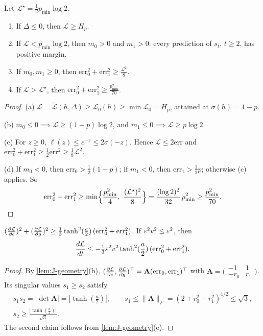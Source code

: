 \begin{lemma}
\label{lem:J-levels}
Let $\mathcal L^\star=\frac{1}{2}p_{\min}\log2$.
\begin{enumerate}[label=(\alph*),leftmargin=*,itemsep=2pt,topsep=3pt]
\item If $\Delta\le0$, then $\mathcal L\ge H_p$.
\item If $\mathcal L<p_{\min}\log2$, then $m_0>0$ and $m_1>0$: every prediction of $s_t$, $t\ge2$, has positive margin.
\item If $m_0,m_1\ge0$, then $\mathrm{err}_0^2+\mathrm{err}_1^2\ge \frac{\mathcal L^2}{8}$.
\item If $\mathcal L>\mathcal L^\star$, then $\mathrm{err}_0^2+\mathrm{err}_1^2\ge \frac{p_{\min}^2}{70}$.
\end{enumerate}
\end{lemma}

\begin{proof}
(a) $\mathcal L=\tilde{\mathcal L}( h,\Delta)\ge \mathcal L_0( h)\ge\min \mathcal L_0=H_p$, attained at $\sigma( h)=1-p$.

(b) $m_0\le0\implies \mathcal L\ge(1-p)\log2$, and $m_1\le0\implies \mathcal L\ge p\log2$.

(c) For $z\ge0$, $\ell(z)\le e^{-z}\le2\sigma(-z)$. Hence $\mathcal L\le2\mathrm{err}$ and $\mathrm{err}_0^2+\mathrm{err}_1^2\ge\frac{1}{2}\mathrm{err}^2\ge\frac{1}{8}\mathcal L^2$.

(d) If $m_0<0$, then $\mathrm{err}_0>\frac{1}{2}(1-p)$; if $m_1<0$, then $\mathrm{err}_1>\frac{1}{2}p$; otherwise (c) applies. So
\[
 \mathrm{err}_0^2+\mathrm{err}_1^2\ge\min\Bigl\{\frac{p_{\min}^2}{4},\ \frac{(\mathcal L^\star)^2}{8}\Bigr\}=\frac{(\log2)^2}{32}\,p_{\min}^2\ge\frac{p_{\min}^2}{70}.
\]
\end{proof}

\begin{lemma}
\label{lem:J-gradient}
$( \pd{\mathcal L}{c})^2+( \pd{\mathcal L}{g})^2\ge\frac{1}{3}\tanh^2(\frac{a}{2})\,(\mathrm{err}_0^2+\mathrm{err}_1^2)$. If $\varepsilon^2v^2\le\varepsilon^2$, then
\[
 \ddt{\mathcal L}\le-\tfrac{1}{3}\initscale^2v^2\tanh^2(\frac{a}{2})\,(\mathrm{err}_0^2+\mathrm{err}_1^2).
\]
\end{lemma}

\begin{proof}
By \cref{lem:J-geometry}(b), $(\pd{\mathcal L}{c},\pd{\mathcal L}{g})^\top=\mathbf A(\mathrm{err}_0,\mathrm{err}_1)^\top$ with $\mathbf A=\bigl(\begin{smallmatrix}-1&1\\-r_0&r_1\end{smallmatrix}\bigr)$. Its singular values $s_1\ge s_2$
satisfy
\begin{gather*}
 s_1s_2=|\det\mathbf A|=|\tanh(\frac{a}{2})|,\qquad s_1\le\|\mathbf A\|_F=(2+r_0^2+r_1^2)^{1/2}\le\sqrt3,\\
 s_2\ge\frac{|\tanh(\frac{a}{2})|}{\sqrt3} .
\end{gather*}
The second claim follows from \cref{lem:J-geometry}(e).
\end{proof}

